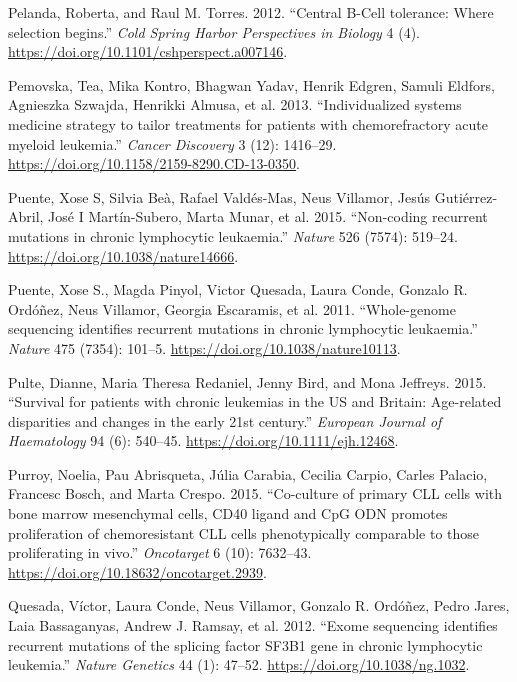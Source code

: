 \documentclass[11pt, a4paper, twosided]{book}
\newenvironment{CSLReferences}%
  {}%
  {\par}
\begin{document}
\begin{CSLReferences}{1}{0}
\leavevmode{}%
Pelanda, Roberta, and Raul M. Torres. 2012. {``{Central B-Cell tolerance: Where selection begins}.''} \emph{Cold Spring Harbor Perspectives in Biology} 4 (4). \url{https://doi.org/10.1101/cshperspect.a007146}.

\leavevmode{}%
Pemovska, Tea, Mika Kontro, Bhagwan Yadav, Henrik Edgren, Samuli Eldfors, Agnieszka Szwajda, Henrikki Almusa, et al. 2013. {``{Individualized systems medicine strategy to tailor treatments for patients with chemorefractory acute myeloid leukemia}.''} \emph{Cancer Discovery} 3 (12): 1416--29. \url{https://doi.org/10.1158/2159-8290.CD-13-0350}.

\leavevmode{}%
Puente, Xose S, Silvia Beà, Rafael Valdés-Mas, Neus Villamor, Jesús Gutiérrez-Abril, José I Martín-Subero, Marta Munar, et al. 2015. {``{Non-coding recurrent mutations in chronic lymphocytic leukaemia.}''} \emph{Nature} 526 (7574): 519--24. \url{https://doi.org/10.1038/nature14666}.

\leavevmode{}%
Puente, Xose S., Magda Pinyol, Victor Quesada, Laura Conde, Gonzalo R. Ordóñez, Neus Villamor, Georgia Escaramis, et al. 2011. {``{Whole-genome sequencing identifies recurrent mutations in chronic lymphocytic leukaemia}.''} \emph{Nature} 475 (7354): 101--5. \url{https://doi.org/10.1038/nature10113}.

\leavevmode{}%
Pulte, Dianne, Maria Theresa Redaniel, Jenny Bird, and Mona Jeffreys. 2015. {``{Survival for patients with chronic leukemias in the US and Britain: Age-related disparities and changes in the early 21st century.}''} \emph{European Journal of Haematology} 94 (6): 540--45. \url{https://doi.org/10.1111/ejh.12468}.

\leavevmode{}%
Purroy, Noelia, Pau Abrisqueta, Júlia Carabia, Cecilia Carpio, Carles Palacio, Francesc Bosch, and Marta Crespo. 2015. {``{Co-culture of primary CLL cells with bone marrow mesenchymal cells, CD40 ligand and CpG ODN promotes proliferation of chemoresistant CLL cells phenotypically comparable to those proliferating in vivo}.''} \emph{Oncotarget} 6 (10): 7632--43. \url{https://doi.org/10.18632/oncotarget.2939}.

\leavevmode{}%
Quesada, Víctor, Laura Conde, Neus Villamor, Gonzalo R. Ordóñez, Pedro Jares, Laia Bassaganyas, Andrew J. Ramsay, et al. 2012. {``{Exome sequencing identifies recurrent mutations of the splicing factor SF3B1 gene in chronic lymphocytic leukemia}.''} \emph{Nature Genetics} 44 (1): 47--52. \url{https://doi.org/10.1038/ng.1032}.


\end{CSLReferences}
\end{document}
